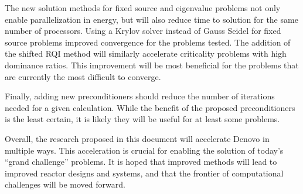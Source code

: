 The new solution methods for fixed source and eigenvalue problems not only enable parallelization in energy, but will also reduce time to solution for the same number of processors. Using a Krylov solver instead of Gauss Seidel for fixed source problems improved convergence for the problems tested. The addition of the shifted RQI method will similarly accelerate criticality problems with high dominance ratios. This improvement will be most beneficial for the problems that are currently the most difficult to converge.

Finally, adding new preconditioners should reduce the number of iterations needed for a given calculation. While the benefit of the proposed preconditioners is the least certain, it is likely they will be useful for at least some problems. 

Overall, the research proposed in this document will accelerate Denovo in multiple ways. This acceleration is crucial for enabling the solution of today's ``grand challenge'' problems. It is hoped that improved methods will lead to improved reactor designs and systems, and that the frontier of computational challenges will be moved forward.  


